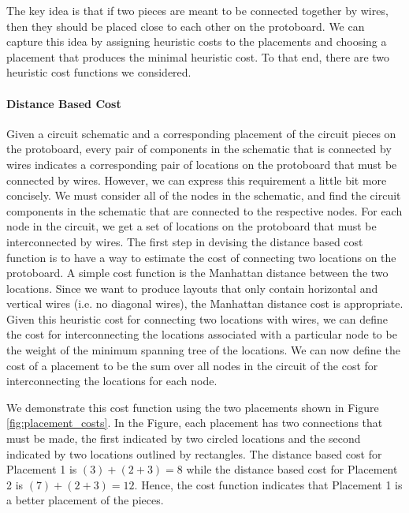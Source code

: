 The key idea is that if two pieces are meant to be connected together by wires,
then they should be placed close to each other on the protoboard. We can
capture this idea by assigning heuristic costs to the placements and choosing
a placement that produces the minimal heuristic cost. To that end, there are two
heuristic cost functions we considered.

\paragraph{Distance Based Cost}
Given a circuit
schematic and a corresponding placement of the circuit pieces on the protoboard,
every pair of components in the schematic that is connected by wires indicates
a corresponding pair of
locations on the protoboard that must be connected by wires. However, we can
express this requirement a little bit more concisely. We must consider all
of the nodes in the schematic, and find the circuit components in the schematic
that are connected to the respective nodes. For each node in the circuit, we
get a set of locations on the protoboard that must be interconnected by wires.
The first step in devising the distance based cost function is to have a way to
estimate the cost of connecting two locations on the protoboard. A simple
cost function is the Manhattan distance between the two
locations. Since we want to produce layouts that only contain
horizontal and vertical wires (i.e. no diagonal wires), the Manhattan distance
cost is appropriate. Given this heuristic cost for connecting two locations with
wires, we can define the cost for interconnecting the locations
associated with a particular node to be the weight of the minimum spanning tree
of the locations. We can now define the cost of a placement to be the sum over
all nodes in the circuit of the cost for interconnecting the locations for each
node.

We demonstrate this cost function using the two placements shown in Figure
\ref{fig:placement_costs}. In the Figure, each placement has two connections
that must be made, the first indicated by two circled locations and the second
indicated by two locations outlined by rectangles. The distance based cost for
Placement 1 is $(3) + (2 + 3) = 8$ while the distance based cost for Placement 2
is $(7) + (2 + 3) = 12$. Hence, the cost function indicates that Placement 1
is a better placement of the pieces.

